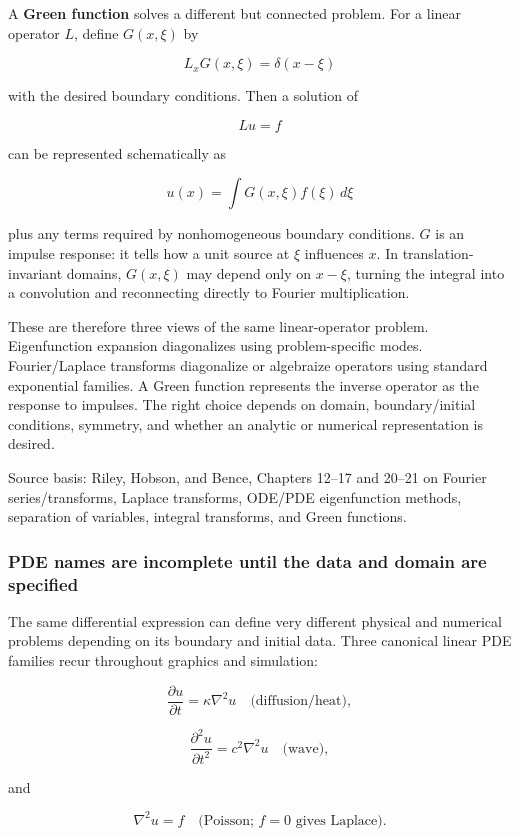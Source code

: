 A \textbf{Green function} solves a different but connected problem. For a linear operator \(L\), define \(G(x,\xi)\) by

\[
L_x G(x,\xi)=\delta(x-\xi)
\]

with the desired boundary conditions. Then a solution of

\[
L u=f
\]

can be represented schematically as

\[
u(x)
=
\int G(x,\xi)f(\xi)\,d\xi
\]

plus any terms required by nonhomogeneous boundary conditions. \(G\) is an impulse response: it tells how a unit source at \(\xi\) influences \(x\). In translation-invariant domains, \(G(x,\xi)\) may depend only on \(x-\xi\), turning the integral into a convolution and reconnecting directly to Fourier multiplication.

These are therefore three views of the same linear-operator problem. Eigenfunction expansion diagonalizes using problem-specific modes. Fourier/Laplace transforms diagonalize or algebraize operators using standard exponential families. A Green function represents the inverse operator as the response to impulses. The right choice depends on domain, boundary/initial conditions, symmetry, and whether an analytic or numerical representation is desired.

Source basis: Riley, Hobson, and Bence, Chapters 12--17 and 20--21 on Fourier series/transforms, Laplace transforms, ODE/PDE eigenfunction methods, separation of variables, integral transforms, and Green functions.

\subsubsection{PDE names are incomplete until the data and domain are specified}\label{02-foundations-ii-ch025-pde-names-are-incomplete-until-the-data-and-domain-are-specified}

The same differential expression can define very different physical and numerical problems depending on its boundary and initial data. Three canonical linear PDE families recur throughout graphics and simulation:

\[
\frac{\partial u}{\partial t}
=
\kappa\nabla^2u
\quad\text{(diffusion/heat)},
\]

\[
\frac{\partial^2u}{\partial t^2}
=
c^2\nabla^2u
\quad\text{(wave)},
\]

and

\[
\nabla^2u=f
\quad\text{(Poisson; \(f=0\) gives Laplace)}.
\]

